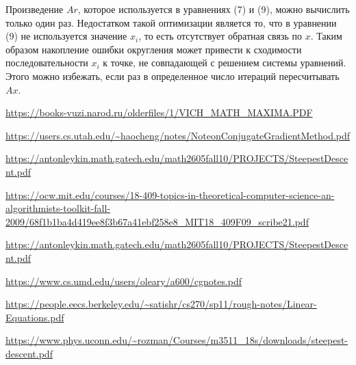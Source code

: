 \documentclass{article}
\begin{document}
Произведение $Ar$, которое используется в уравнениях (7) и (9), можно вычислить только один раз. Недостатком 
такой оптимизации является то, что в уравнении (9) не используется значение $x_i$, то есть отсутствует обратная связь по $x$.
Таким образом накопление ошибки округления может привести к сходимости последовательности ${x_i}$ к точке, не совпадающей с
решением системы уравнений. Этого можно избежать, если раз в определенное число итераций пересчитывать $Ax$.

 
\begin{thebibliography}{9}

  \url{https://books-vuzi.narod.ru/olderfiles/1/VICH_MATH_MAXIMA.PDF}



  \url{https://users.cs.utah.edu/~haocheng/notes/NoteonConjugateGradientMethod.pdf}

  \url{https://antonleykin.math.gatech.edu/math2605fall10/PROJECTS/SteepestDescent.pdf}


  \url{https://ocw.mit.edu/courses/18-409-topics-in-theoretical-computer-science-an-algorithmists-toolkit-fall-2009/68f1b1ba4d419ee8f3b67a41ebf258e8_MIT18_409F09_scribe21.pdf}


  \url{https://antonleykin.math.gatech.edu/math2605fall10/PROJECTS/SteepestDescent.pdf}

  \url{https://www.cs.umd.edu/users/oleary/a600/cgnotes.pdf}


  \url{https://people.eecs.berkeley.edu/~satishr/cs270/sp11/rough-notes/Linear-Equations.pdf}


  \url{https://www.phys.uconn.edu/~rozman/Courses/m3511_18s/downloads/steepest-descent.pdf}

\end{thebibliography}
\end{document}
